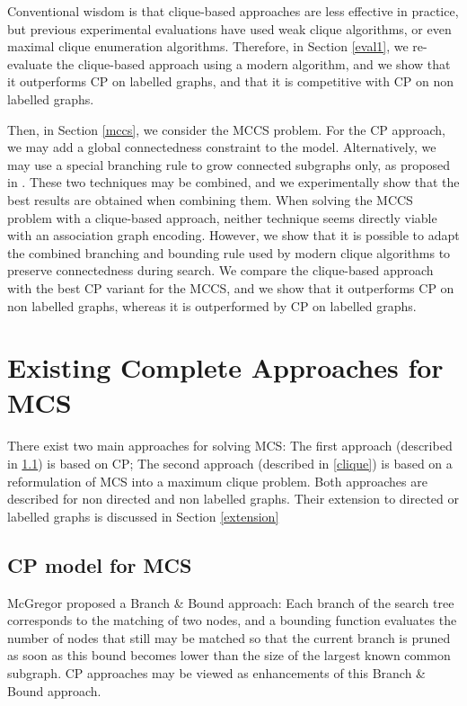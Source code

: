 \documentclass{llncs}
\begin{document}
Conventional wisdom is that clique-based approaches are less effective in practice, but previous
experimental evaluations have used weak clique algorithms, or even maximal clique enumeration
algorithms.  Therefore, in Section \ref{eval1}, we  re-evaluate the clique-based approach using a
modern algorithm, and we show that it outperforms CP on labelled graphs, and that it is competitive
with CP on non labelled graphs.

Then, in Section \ref{mccs}, we consider the MCCS problem. For the CP approach, we may add a global
connectedness constraint to the model. Alternatively, we may use a special branching rule to grow
connected subgraphs only, as proposed in \cite{DBLP:conf/mco/VismaraV08}. These two techniques may
be combined, and we experimentally show that the best results are obtained when combining them.
When solving the MCCS problem with a clique-based approach, neither technique seems directly viable
with an association graph encoding.  However, we show that it is possible to adapt the combined
branching and bounding rule used by modern clique algorithms to preserve connectedness during
search.  We compare the clique-based approach with the best CP variant for the MCCS, and we show
that it outperforms CP on non labelled graphs, whereas it is outperformed by CP on labelled graphs.


\section{Existing Complete Approaches for MCS}\label{existing}


There exist two main approaches for solving MCS: The first approach (described in \ref{CP}) is based
on CP; The second approach (described in \ref{clique}) is based on a reformulation of MCS into a
maximum clique problem. Both approaches are described for non directed and non labelled graphs.
Their extension to directed or labelled graphs is discussed in Section \ref{extension}

\subsection{CP model for MCS}
\label{CP}

McGregor \cite{McGreg82} proposed a Branch \& Bound approach: Each branch of the search tree
corresponds to the matching of two nodes, and a  bounding function evaluates the number of nodes
that still may be matched so that the current branch is pruned as soon as this bound becomes lower
than the size of the largest known common subgraph. CP approaches may be viewed as enhancements of
this Branch \& Bound approach.
\end{document}
